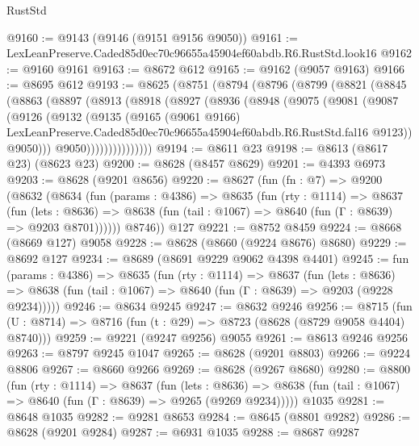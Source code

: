 \begin{lexlean}{RustStd}
\begin{coremodule}
@9160 := @9143 (@9146 (@9151 @9156 @9050))
@9161 := LexLeanPreserve.Caded85d0ec70c96655a45904ef60abdb.R6.RustStd.look16
@9162 := @9160 @9161
@9163 := @8672 @612
@9165 := @9162 (@9057 @9163)
@9166 := @8695 @612
@9193 := @8625
    (@8751
      (@8794
        (@8796
          (@8799
            (@8821
              (@8845
                (@8863
                  (@8897
                    (@8913
                      (@8918
                        (@8927
                          (@8936
                            (@8948
                              (@9075
                                (@9081
                                  (@9087
                                    (@9126
                                      (@9132
                                        (@9135
                                          (@9165
                                            (@9061 @9166)
                                            LexLeanPreserve.Caded85d0ec70c96655a45904ef60abdb.R6.RustStd.fal16
                                            @9123))
                                        @9050)))
                                  @9050)))))))))))))))
@9194 := @8611 @23
@9198 := @8613 (@8617 @23) (@8623 @23)
@9200 := @8628 (@8457 @8629)
@9201 := @4393 @6973
@9203 := @8628 (@9201 @8656)
@9220 := @8627
    (fun (fn : @7) =>
    @9200
      (@8632
        (@8634
          (fun (params : @4386) =>
          @8635
            (fun (rty : @1114) =>
            @8637
              (fun (lets : @8636) =>
              @8638 (fun (tail : @1067) => @8640 (fun (Γ : @8639) => @9203 @8701))))))
        @8746))
    @127
@9221 := @8752 @8459
@9224 := @8668 (@8669 @127) @9058
@9228 := @8628 (@8660 (@9224 @8676) @8680)
@9229 := @8692 @127
@9234 := @8689 (@8691 @9229 @9062 @4398 @4401)
@9245 := fun (params : @4386) =>
  @8635
    (fun (rty : @1114) =>
    @8637
      (fun (lets : @8636) =>
      @8638 (fun (tail : @1067) => @8640 (fun (Γ : @8639) => @9203 (@9228 @9234)))))
@9246 := @8634 @9245
@9247 := @8632 @9246
@9256 := @8715 (fun (U : @8714) => @8716 (fun (t : @29) => @8723 (@8628 (@8729 @9058 @4404) @8740)))
@9259 := @9221 (@9247 @9256) @9055
@9261 := @8613 @9246 @9256
@9263 := @8797 @9245 @1047
@9265 := @8628 (@9201 @8803)
@9266 := @9224 @8806
@9267 := @8660 @9266
@9269 := @8628 (@9267 @8680)
@9280 := @8800
    (fun (rty : @1114) =>
    @8637
      (fun (lets : @8636) =>
      @8638 (fun (tail : @1067) => @8640 (fun (Γ : @8639) => @9265 (@9269 @9234)))))
    @1035
@9281 := @8648 @1035
@9282 := @9281 @8653
@9284 := @8645 (@8801 @9282)
@9286 := @8628 (@9201 @9284)
@9287 := @6931 @1035
@9288 := @8687 @9287

\end{coremodule}
\end{lexlean}
